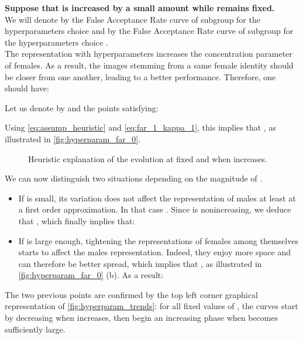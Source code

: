 \documentclass[nohyperref]{article}
\theoremstyle{plain}
\theoremstyle{definition}
\theoremstyle{remark}
\begin{document}
\smallskip

{\bf Suppose that  is increased by a small amount  while  remains fixed.} \\
We will denote by  the False Acceptance Rate curve of subgroup  for the hyperparameters choice  and by  the False Acceptance Rate curve of subgroup  for the hyperparameters choice .\\
The representation with hyperparameters  increases the concentration parameter of females. As a result, the images stemming from a same female identity should be closer from one another, leading to a better  performance. Therefore, one should have:

Let us denote by  and  the points satisfying:

Using \autoref{eq:assump_heuristic} and \autoref{eq:far_1_kappa_1}, this implies that , as illustrated in \autoref{fig:hyperparam_far_0}.

\begin{figure}[h]
    \centering
    

    
    




\caption{Heuristic explanation of the  evolution at fixed  and when  increases.}\label{fig:hyperparam_far_0}
\end{figure}




We can now distinguish two situations depending on the magnitude of .
\begin{itemize}
    \item If  is small, its variation does not affect the representation of males at least at a first order approximation. In that case . Since  is nonincreasing, we deduce that , which finally implies that:
 

    \item If  is large enough, tightening the representations of females among themselves starts to affect the males representation. Indeed, they enjoy more space and can therefore be better spread, which implies that , as illustrated in \autoref{fig:hyperparam_far_0} (b). As a result:
     
\end{itemize}
The two previous points are confirmed by the top left corner graphical representation of \autoref{fig:hyperparam_trends}: for all fixed values of , the curves start by decreasing when  increases, then begin an increasing phase when  becomes sufficiently large.
\end{document}
